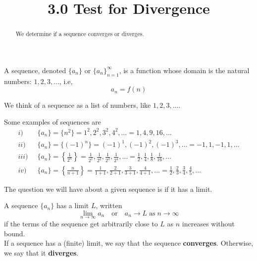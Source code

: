 \documentclass[handout]{ximera}
\title{3.0 Test for Divergence}
\begin{document}
\begin{abstract}
We determine if a sequence converges or diverges.
\end{abstract}

\maketitle

\begin{definition}[Sequence]
A sequence, denoted $\displaystyle \{a_n\}$ or $\displaystyle \{a_n\}_{n=1}^\infty$, is a function whose domain is the natural numbers: $1, 2, 3, \dots$, i.e,
\[
a_n = f(n)
\]
\end{definition}
We think of a sequence as a list of numbers, like $1, 2, 3, \dots$.

Some examples of sequences are
\begin{align*}
i) \;\; &  \{a_n\} = \{n^2\} = 1^2, 2^2, 3^2, 4^2, \dots = 1, 4, 9, 16,  \dots\\
ii) \;\; &  \{a_n\} = \{(-1)^n\} = (-1)^1, (-1)^2, (-1)^3, \dots = -1, 1, -1, 1, \dots\\
iii) \;\; &  \{a_n\} = \left\{\frac{1}{2^n}\right\} = \frac{1}{2^1}, \frac{1}{2^2}, \frac{1}{2^3}, \frac{1}{2^4}, \dots = \frac12, \frac14, \frac18, \frac{1}{16}, \dots\\
iv) \;\; &   \{a_n\} = \left\{\frac{n}{n+1}\right\} = \frac{1}{1+1}, \frac{2}{2+1}, \frac{3}{3+1}, \frac{4}{4+1}, \dots = \frac12, \frac23, \frac34, \frac45, \dots
\end{align*}

The question we will have about a given sequence is if it has a limit.

\begin{definition}
A sequence $\{a_n\}$ has a limit $L$, written
\[
\lim_{n \to \infty} a_n \quad \mbox{or} \quad a_n \to L \; \mbox{as} \; n \to \infty
\]
if the terms of the sequence get arbitrarily close to $L$ as $n$ increases without bound.\\
If a sequence has a (finite) limit, we say that the sequence {\bf converges}.  Otherwise, we say that it {\bf diverges}.
\end{definition}
\end{document}
